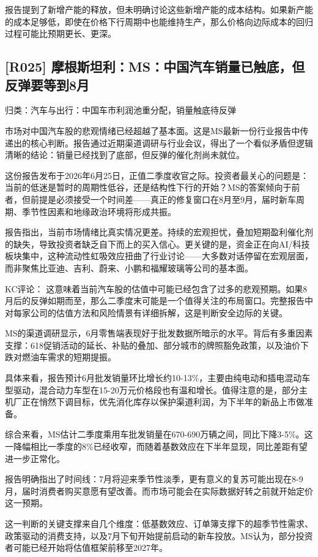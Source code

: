 \documentclass[11pt]{ctexart}
\begin{document}
报告提到了新增产能的释放，但未明确讨论这些新增产能的成本结构。如果新产能的成本足够低，即使在价格下行周期中也能维持生产，那么价格向边际成本的回归过程可能比预期更长、更深。

\subsection{[R025] 摩根斯坦利：MS：中国汽车销量已触底，但反弹要等到8月}
{\small\color{refgray}归类：汽车与出行：中国车市利润池重分配，销量触底待反弹}

市场对中国汽车股的悲观情绪已经超越了基本面。这是MS最新一份行业报告中传递出的核心判断。报告通过近期渠道调研与行业会议，得出了一个看似矛盾但逻辑清晰的结论：销量已经找到了底部，但反弹的催化剂尚未就位。

这份报告发布于2026年6月25日，正值二季度收官之际。投资者最关心的问题是：当前的低迷是暂时的周期性低谷，还是结构性下行的开始？MS的答案倾向于前者，但前提是必须接受一个时间差——真正的修复窗口在8月至9月，届时新车周期、季节性因素和地缘政治环境将形成共振。

报告指出，当前市场情绪比真实情况更差。持续的宏观担忧，叠加短期盈利催化剂的缺失，导致投资者缺乏自下而上的买入信心。更关键的是，资金正在向AI/科技板块集中，这种流动性虹吸效应扭曲了行业讨论——大多数对话停留在宏观层面，而非聚焦比亚迪、吉利、蔚来、小鹏和福耀玻璃等公司的基本面。

KC评论： 这意味着当前汽车股的估值中可能已经包含了过多的悲观预期。如果8月后的反弹如期而至，那么二季度末可能是一个值得关注的布局窗口。完整报告中对每家公司的估值方法和风险情景有详细拆解，这是判断安全边际的关键。

MS的渠道调研显示，6月零售端表现好于批发数据所暗示的水平。背后有多重因素支撑：618促销活动的延长、补贴的叠加、部分城市的牌照豁免政策，以及油价下跌对燃油车需求的短期提振。

具体来看，报告预计6月批发销量环比增长约10-13\%，主要由纯电动和插电混动车型驱动，混合动力车型在15-20万元价格段也有温和增长。值得注意的是，部分主机厂正在悄然下调目标，优先消化库存以保护渠道利润，为下半年的新品上市做准备。

综合来看，MS估计二季度乘用车批发销量在670-690万辆之间，同比下降3-5\%。这一降幅相比一季度的8\%已经收窄，而随着基数效应在下半年显现，同比差距有望进一步正常化。

报告明确指出了时间线：7月将迎来季节性淡季，更有意义的复苏可能出现在8-9月，届时消费者购买意愿有望改善。而市场可能会在实际数据好转之前就开始定价这一预期。

这一判断的关键支撑来自几个维度：低基数效应、订单簿支撑下的超季节性需求、政策驱动的消费支持，以及7月下旬开始提前启动的新车投放。MS认为，部分投资者可能已经开始将估值框架前移至2027年。
\end{document}

